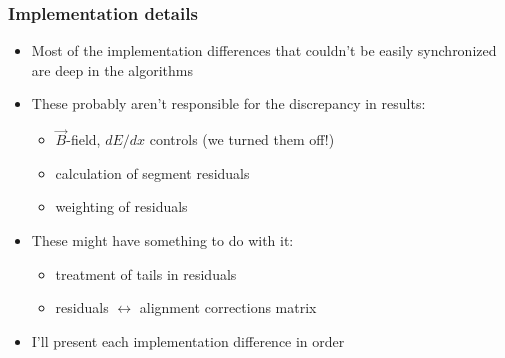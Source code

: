 \documentclass[compress]{beamer}
\begin{document}
\begin{frame}
\frametitle{Implementation details}
\begin{itemize}\setlength{\itemsep}{0.2 cm}
\item Most of the implementation differences that couldn't be easily synchronized are deep in the algorithms
\item These probably aren't responsible for the discrepancy in \mbox{results:\hspace{-1 cm}}
\begin{itemize}\setlength{\itemsep}{0.1 cm}
\item $\vec{B}$-field, $dE/dx$ controls (we turned them off!)
\item calculation of segment residuals
\item weighting of residuals
\end{itemize}
\item These might have something to do with it:
\begin{itemize}\setlength{\itemsep}{0.1 cm}
\item treatment of tails in residuals
\item residuals $\leftrightarrow$ alignment corrections matrix
\end{itemize}
\item I'll present each implementation difference in order
\end{itemize}
\end{frame}
\end{document}

